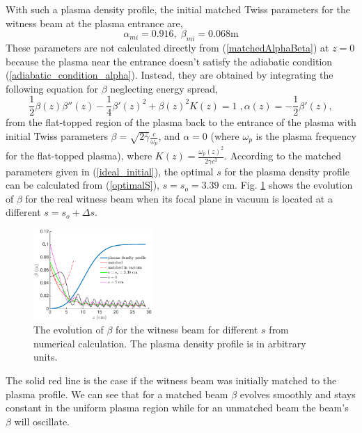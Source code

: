 \documentclass[%
reprint, superscriptaddress,
 amsmath,amssymb, aps,
prstab,
]{revtex4-2}
\begin{document}
With such a plasma density profile,  the initial matched
Twiss parameters for the witness beam at the plasma entrance are,
\begin{equation} \alpha_{mi} = 0.916, \; \beta_{mi} = 0.068 \mbox{m}
\label{ideal_initial} \end{equation} These parameters are not calculated directly from (\ref{matchedAlphaBeta}) at $z=0$
 because the plasma near the entrance doesn't satisfy the adiabatic condition (\ref{adiabatic_condition_alpha}). Instead, they are
obtained by integrating the following equation for $\beta$ neglecting energy spread, 
 \begin{equation} \frac{1}{2} \beta(z) \beta''(z) -
\frac{1}{4} \beta'(z)^2 + \beta(z)^2 K(z) = 1 \;, \alpha(z) =
-\frac{1}{2} \beta'(z), \label{ODE} \end{equation} 
from the flat-topped
region of the plasma back to the entrance of the plasma with initial
Twiss parameters $\beta = \sqrt{2\bar{\gamma}}\frac{c}{\omega_p}$, and $
\alpha = 0$ (where $\omega_p$ is the plasma frequency for the
flat-topped plasma),
where $K(z) =
\frac{\omega_p(z)^2}{2 \gamma c^2}$. According to the matched
parameters given in (\ref{ideal_initial}), the optimal $s$ for the
plasma density profile can be calculated from (\ref{optimalS}), $s = s_o = 3.39$ cm. Fig.
\ref{fig:beta_evolvement_for_different_s} shows the evolution of $\beta$ for the real witness beam when its focal plane in vacuum is located at
a different $s = s_o + \Delta s$. \begin{figure}[htbp] \centering
\includegraphics[width=0.4\textwidth]{beta_different_cases.eps}
\caption{The evolution of $\beta$ for the witness beam for different $s$ from numerical calculation. The plasma
density profile is in arbitrary units.}
\label{fig:beta_evolvement_for_different_s} \end{figure} The solid red
line is the case if the witness beam was initially matched to the plasma
profile. We can see that for a matched beam $\beta$ evolves smoothly and stays constant
in the uniform plasma region while for an unmatched beam the beam's $\beta$ will oscillate.
\end{document}
